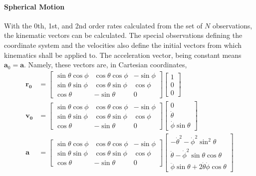 \documentclass[letterpaper,11pt,english]{sphinxmanual}
\begin{document}
\paragraph{Spherical Motion}
\label{\detokenize{technical/algorithms/spherical_kinematics:spherical-motion}}
\sphinxAtStartPar
With the 0th, 1st, and 2nd order rates calculated from the set of \(N\)
observations, the kinematic vectors can be calculated. The special
observations defining the coordinate system and the velocities also define
the initial vectors from which kinematics shall be applied to. The
acceleration vector, being constant means \(\mathbf{a}_0 = \mathbf{a}\).
Namely, these vectors are, in Cartesian coordinates,
\begin{equation*}
\begin{split}\mathbf{r_0} &= \begin{bmatrix}
\sin\theta\cos\phi & \cos\theta\cos\phi & -\sin\phi \\
\sin\theta\sin\phi & \cos\theta\sin\phi &  \cos\phi \\
\cos\theta         & -\sin\theta        & 0
\end{bmatrix} \begin{bmatrix} 1 \\ 0 \\ 0 \end{bmatrix} \\
\mathbf{v_0} &= \begin{bmatrix}
\sin\theta\cos\phi & \cos\theta\cos\phi & -\sin\phi \\
\sin\theta\sin\phi & \cos\theta\sin\phi &  \cos\phi \\
\cos\theta         & -\sin\theta        & 0
\end{bmatrix} \begin{bmatrix} 0 \\ \dot\theta \\ \dot\phi \sin\theta \end{bmatrix} \\
\mathbf{a} &= \begin{bmatrix}
\sin\theta\cos\phi & \cos\theta\cos\phi & -\sin\phi \\
\sin\theta\sin\phi & \cos\theta\sin\phi &  \cos\phi \\
\cos\theta         & -\sin\theta        & 0
\end{bmatrix} \begin{bmatrix} -\dot\theta^2 - \dot\phi^2\sin^2\theta \\ \ddot\theta - \dot\phi^2\sin\theta\cos\theta \\ \ddot\phi\sin\theta  + 2 \dot\theta\dot\phi\cos\theta \end{bmatrix}\end{split}
\end{equation*}
\end{document}

